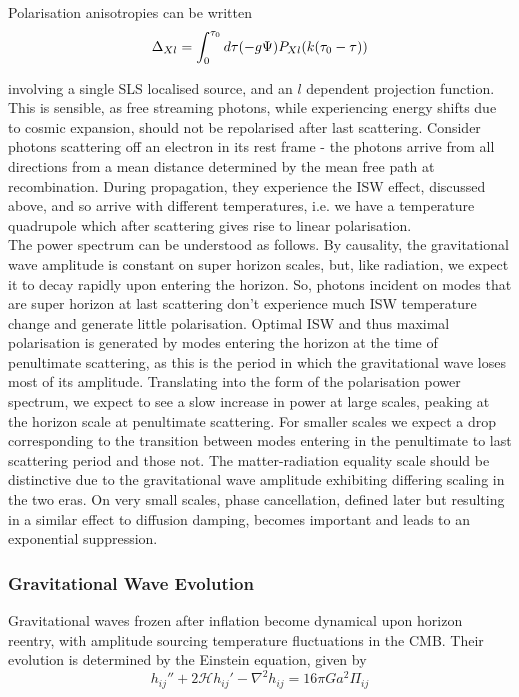 \documentclass[a4paper,10pt]{article}
\begin{document}
Polarisation anisotropies can be written
\begin{equation}
\Delta_{Xl} = \int_0^{\tau_0} d\tau (-g\Psi) P_{Xl}(k(\tau_0-\tau))\\
\end{equation}

involving a single SLS localised source, and an $l$ dependent projection function. This is sensible, as free streaming photons, while experiencing energy shifts due to cosmic expansion, should not be repolarised after last scattering. Consider photons scattering off an electron in its rest frame - the photons arrive from all directions from a mean distance determined by the mean free path at recombination. During propagation, they experience the ISW effect, discussed above, and so arrive with different temperatures, i.e. we have a temperature quadrupole which after scattering gives rise to linear polarisation. \\

The power spectrum can be understood as follows. By causality, the gravitational wave amplitude is constant on super horizon scales, but, like radiation, we expect it to decay rapidly upon entering the horizon. So, photons incident on modes that are super horizon at last scattering don't experience much ISW temperature change and generate little polarisation. Optimal ISW and thus maximal polarisation is generated by modes entering the horizon at the time of penultimate scattering, as this is the period in which the gravitational wave loses most of its amplitude. Translating into the form of the polarisation power spectrum, we expect to see a slow increase in power at large scales, peaking at the horizon scale at penultimate scattering. For smaller scales we expect a drop corresponding to the transition between modes entering in the penultimate to last scattering period and those not. The matter-radiation equality scale should be distinctive due to the gravitational wave amplitude exhibiting differing scaling in the two eras. On very small scales, phase cancellation, defined later but resulting in a similar effect to diffusion damping, becomes important and leads to an exponential suppression. 

\subsubsection{Gravitational Wave Evolution}
\label{evolution}

Gravitational waves frozen after inflation become dynamical upon horizon reentry, with amplitude sourcing temperature fluctuations in the CMB. Their evolution is determined by the Einstein equation, given by \cite{Pritchard}
\begin{equation}
h_{ij}''+2\mathcal{H}h_{ij}'-\nabla^2h_{ij} = 16\pi Ga^2\Pi_{ij}
\end{equation}
\end{document}
